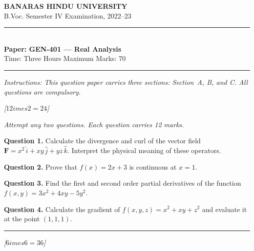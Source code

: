 \documentclass[11pt,a4paper]{article}
\newcommand{\pts}[1]{\hfill   \textit{[#1]}}
\begin{document}
\begin{center}
  {\large\bfseries BANARAS HINDU UNIVERSITY}\\[2pt]
  {\normalsize B.Voc. Semester IV Examination, 2022--23}\\[6pt]
  \rule{0.8\linewidth}{0.5pt}\\[6pt]
  {\large\bfseries Paper: GEN-401 --- Real Analysis}\\[4pt]
  {\normalsize Time: Three Hours \hfill Maximum Marks: 70}
\end{center}

\rule{\linewidth}{0.4pt}

\smallskip



\noindent   \textit{Instructions: This question paper carries three sections: Section~A, B, and C. All questions are compulsory.}

\bigskip




\pts{$12 imes2=24$}

\medskip


\noindent   \textit{Attempt any two questions. Each question carries 12 marks.}

\bigskip




\noindent   \textbf{Question 1.} Calculate the divergence and curl of the vector field $\mathbf{F} = x^2\,\hat{i} + xy\,\hat{j} + yz\,\hat{k}$. Interpret the physical meaning of these operators.

\bigskip




\noindent   \textbf{Question 2.} Prove that $f(x) = 2x + 3$ is continuous at $x = 1$.

\bigskip




\noindent   \textbf{Question 3.} Find the first and second order partial derivatives of the function $f(x,y) = 3x^2 + 4xy - 5y^2$.

\bigskip




\noindent   \textbf{Question 4.} Calculate the gradient of $f(x,y,z) = x^2 + xy + z^2$ and evaluate it at the point $(1,1,1)$.

\bigskip

\rule{\linewidth}{0.4pt}



\pts{$6 imes6=36$}
\end{document}
